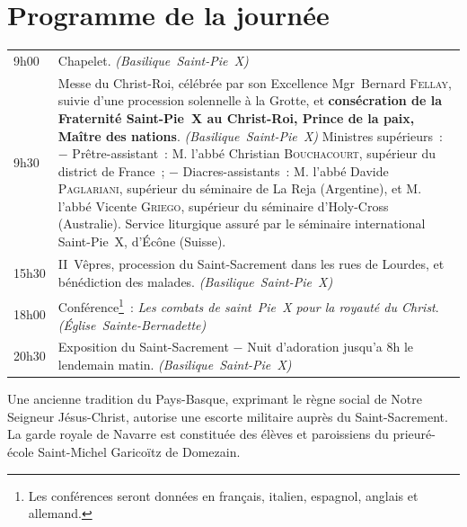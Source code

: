 \documentclass[%
a5paper%
,11pt%
,DIV=15%
,titlepage=on%
,headings=optiontoheadandtoc%
,headings=small%
,parskip=false%
,openany%
]{scrbook}
\newcommand{\lieu}[1]{\hfill\linebreak[3]\hspace*{\stretch{1}}\nolinebreak\mbox{\emph{(#1)}}}
\begin{document}
\section*{Programme de la journée}

\begin{tabularx}{\textwidth-\parindent}{l!{:}X}
9h00	& Chapelet.
	  \lieu{Basilique Saint-Pie X}\\
9h30	& Messe du Christ-Roi, célébrée par son Excellence Mgr Bernard \textsc{Fellay}, suivie d'une procession solennelle à la Grotte, et \textbf{consécration de la Fraternité Saint-Pie X au Christ-Roi, Prince de la paix, Maître des nations}.
	  \lieu{Basilique Saint-Pie X}\linebreak
	  Ministres supérieurs :\linebreak
	  − Prêtre-assistant : M. l'abbé Christian \textsc{Bouchacourt}, supérieur du district de France ;\linebreak
	  − Diacres-assistants : M. l'abbé Davide \textsc{Paglariani}, supérieur du séminaire de La Reja (Argentine), et M. l'abbé Vicente \textsc{Griego}, supérieur du séminaire d'Holy-Cross (Australie).\linebreak
	  Service liturgique assuré par le séminaire international Saint-Pie X, d'Écône (Suisse).\\
15h30	& II\iemes\ Vêpres, procession du Saint-Sacrement dans les rues de Lourdes, et bénédiction des malades.
	  \lieu{Basilique Saint-Pie X}\\
18h00	& Conférence\footnote{Les conférences seront données en français, italien, espagnol, anglais et allemand.} : \emph{Les combats de saint Pie X pour la royauté du Christ}.
	  \lieu{Église Sainte-Bernadette}\\
20h30	& Exposition du Saint-Sacrement − Nuit d'adoration jusqu'a 8h le lendemain matin.
	  \lieu{Basilique Saint-Pie X}
\end{tabularx}

\vfill
{\noindent\footnotesize Une ancienne tradition du Pays-Basque, exprimant le règne social de Notre Seigneur Jésus-Christ, autorise une escorte militaire auprès du Saint-Sacrement. La garde royale de Navarre est constituée des élèves et paroissiens du prieuré-école Saint-Michel Garicoïtz de Domezain.}

\end{document}
